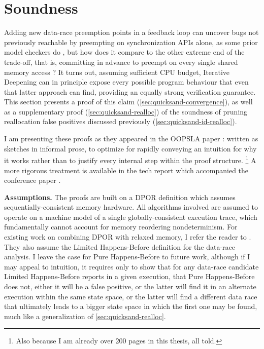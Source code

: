 
\section{Soundness}
\label{sec:quicksand-soundness}

Adding new data-race preemption points in a feedback loop can uncover bugs
not previously reachable by preempting on synchronization APIs alone,
as some prior model checkers do \cite{dbug-ssv},
but how does it compare to the other extreme end of the trade-off,
that is,
committing in advance to preempt on every single shared memory access \cite{spin,inspect}?
It turns out,
assuming sufficient CPU budget,
Iterative Deepening can in principle expose every possible program behaviour that
even that latter approach can find,
providing an equally strong verification guarantee.
This section presents a proof of this claim (\cref{sec:quicksand-convergence}),
as well as a supplementary proof (\cref{sec:quicksand-realloc})
of the soundness of pruning reallocation false positives discussed previously (\cref{sec:quicksand-id-realloc}).

I am presenting these proofs as they appeared in the OOPSLA paper \cite{quicksand}:
written as sketches in informal prose,
to optimize for rapidly conveying an intuition for why it works
rather than to justify every internal step within the proof structure.%
\footnote{Also because I am already over 200 pages in this thesis, all told.}
A more rigorous treatment
is available in the tech report which accompanied the conference paper \cite{quicksand-soundness}.

{\bf Assumptions.}
The proofs are built on a DPOR definition which assumes sequentially-consistent memory hardware.
All algorithms involved are assumed to operate on a machine model of a single globally-consistent execution trace,
which fundamentally cannot account for memory reordering nondeterminism.
For existing work on combining DPOR with relaxed memory, I refer the reader to \cite{tsopso}.
They also assume the Limited Happens-Before definition
for the data-race analysis.
I leave the case for Pure Happens-Before to future work,
although if I may appeal to intuition,
it requires only to show that for any data-race candidate
Limited Happens-Before reports in a given execution,
that Pure Happens-Before does not,
either it will be a false positive,
or the latter will find it in an alternate execution within the same state space,
or the latter will find a different data race that ultimately leads to a bigger state space in which the first one may be found,
much like a generalization of \cref{sec:quicksand-realloc}.

